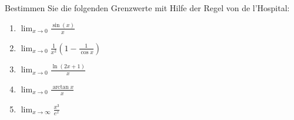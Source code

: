 \begin{ExerciseBlock}
Bestimmen Sie die folgenden Grenzwerte mit Hilfe der Regel von de l'Hospital:
\begin{enumerate}[label=\alph*)]

\item $\lim_{x\rightarrow 0} \frac{\sin(x)}{x}$

\item $\lim_{x\rightarrow 0}\frac{1}{x^2} \left(1-\frac{1}{\cos x}\right)$

\item $\lim_{x\rightarrow 0} \frac{\ln(2x+1)}{x}$

\item $\lim_{x\rightarrow 0} \frac{\arctan x}{x}$

\item $\lim_{x\rightarrow \infty}\frac{x^3}{e^x}$

\end{enumerate}

\end{ExerciseBlock}
